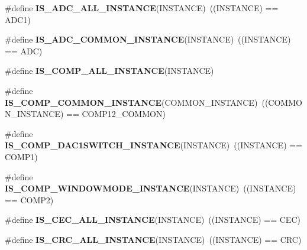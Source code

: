 \begin{DoxyCompactItemize}
\#define {\bfseries I\+S\+\_\+\+A\+D\+C\+\_\+\+A\+L\+L\+\_\+\+I\+N\+S\+T\+A\+N\+CE}(I\+N\+S\+T\+A\+N\+CE)~((I\+N\+S\+T\+A\+N\+CE) == A\+D\+C1)
\item 
\mbox{\label{group___exported__macro_gad8a5831c786b6b265531b890a194cbe2}} 
\#define {\bfseries I\+S\+\_\+\+A\+D\+C\+\_\+\+C\+O\+M\+M\+O\+N\+\_\+\+I\+N\+S\+T\+A\+N\+CE}(I\+N\+S\+T\+A\+N\+CE)~((I\+N\+S\+T\+A\+N\+CE) == A\+DC)
\item 
\#define {\bfseries I\+S\+\_\+\+C\+O\+M\+P\+\_\+\+A\+L\+L\+\_\+\+I\+N\+S\+T\+A\+N\+CE}(I\+N\+S\+T\+A\+N\+CE)
\item 
\mbox{\label{group___exported__macro_gaa7c8a0729f6b2a35ce000556078fa737}} 
\#define {\bfseries I\+S\+\_\+\+C\+O\+M\+P\+\_\+\+C\+O\+M\+M\+O\+N\+\_\+\+I\+N\+S\+T\+A\+N\+CE}(C\+O\+M\+M\+O\+N\+\_\+\+I\+N\+S\+T\+A\+N\+CE)~((C\+O\+M\+M\+O\+N\+\_\+\+I\+N\+S\+T\+A\+N\+CE) == C\+O\+M\+P12\+\_\+\+C\+O\+M\+M\+ON)
\item 
\mbox{\label{group___exported__macro_gaf2340c4592a47c171624fc99e43e4da5}} 
\#define {\bfseries I\+S\+\_\+\+C\+O\+M\+P\+\_\+\+D\+A\+C1\+S\+W\+I\+T\+C\+H\+\_\+\+I\+N\+S\+T\+A\+N\+CE}(I\+N\+S\+T\+A\+N\+CE)~((I\+N\+S\+T\+A\+N\+CE) == C\+O\+M\+P1)
\item 
\mbox{\label{group___exported__macro_gab7f78e841f84bf7ec834748ca685fbc0}} 
\#define {\bfseries I\+S\+\_\+\+C\+O\+M\+P\+\_\+\+W\+I\+N\+D\+O\+W\+M\+O\+D\+E\+\_\+\+I\+N\+S\+T\+A\+N\+CE}(I\+N\+S\+T\+A\+N\+CE)~((I\+N\+S\+T\+A\+N\+CE) == C\+O\+M\+P2)
\item 
\mbox{\label{group___exported__macro_ga10cad35fdea5ffcb9f17973ce98c7dee}} 
\#define {\bfseries I\+S\+\_\+\+C\+E\+C\+\_\+\+A\+L\+L\+\_\+\+I\+N\+S\+T\+A\+N\+CE}(I\+N\+S\+T\+A\+N\+CE)~((I\+N\+S\+T\+A\+N\+CE) == C\+EC)
\item 
\mbox{\label{group___exported__macro_gaa514941a7f02f65eb27450c05e4e8dd1}} 
\#define {\bfseries I\+S\+\_\+\+C\+R\+C\+\_\+\+A\+L\+L\+\_\+\+I\+N\+S\+T\+A\+N\+CE}(I\+N\+S\+T\+A\+N\+CE)~((I\+N\+S\+T\+A\+N\+CE) == C\+RC)
\item 
\mbox{\label{group___exported__macro_ga94426b97cc5f1644d67f291cbcdba6d8}} 

\end{DoxyCompactItemize}
